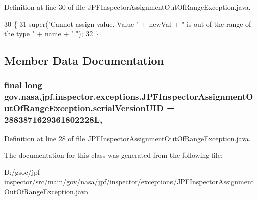 Definition at line 30 of file J\+P\+F\+Inspector\+Assignment\+Out\+Of\+Range\+Exception.\+java.


\begin{DoxyCode}
30                                                                               \{
31     super(\textcolor{stringliteral}{"Cannot assign value. Value "} + newVal + \textcolor{stringliteral}{" is out of the range of the type "} + name + \textcolor{stringliteral}{"."});
32   \}
\end{DoxyCode}


\subsection{Member Data Documentation}
\subsubsection[{\texorpdfstring{serial\+Version\+U\+ID}{serialVersionUID}}]{\setlength{\rightskip}{0pt plus 5cm}final long gov.\+nasa.\+jpf.\+inspector.\+exceptions.\+J\+P\+F\+Inspector\+Assignment\+Out\+Of\+Range\+Exception.\+serial\+Version\+U\+ID = 2883871629361802228L\hspace{0.3cm}{\ttfamily [static]}, {\ttfamily [private]}}\hypertarget{classgov_1_1nasa_1_1jpf_1_1inspector_1_1exceptions_1_1_j_p_f_inspector_assignment_out_of_range_exception_a796a819ab3e77536b8ed8316631f1edb}{}\label{classgov_1_1nasa_1_1jpf_1_1inspector_1_1exceptions_1_1_j_p_f_inspector_assignment_out_of_range_exception_a796a819ab3e77536b8ed8316631f1edb}


Definition at line 28 of file J\+P\+F\+Inspector\+Assignment\+Out\+Of\+Range\+Exception.\+java.



The documentation for this class was generated from the following file\+:\begin{DoxyCompactItemize}
\item 
D\+:/gsoc/jpf-\/inspector/src/main/gov/nasa/jpf/inspector/exceptions/\hyperlink{_j_p_f_inspector_assignment_out_of_range_exception_8java}{J\+P\+F\+Inspector\+Assignment\+Out\+Of\+Range\+Exception.\+java}\end{DoxyCompactItemize}
